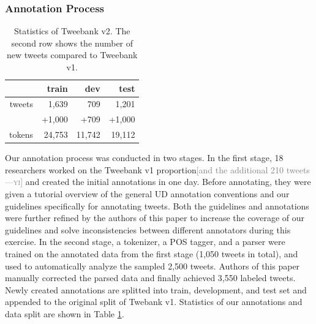 \documentclass[11pt,a4paper]{article}
\newcommand{\yicomment}[1]{\textcolor{gray}{[#1 ---\textsc{yi}]}}
\begin{document}
\subsubsection{Annotation Process}
\begin{table}
	\centering
	\begin{tabular}{rrrr}
		\hline
		& train & dev & test \\
		\hline
		tweets 		&	1,639 		&	709		&	1,201\\
		& +1,000 & +709 & +1,000\\
		tokens 		&	24,753		&	11,742	&	19,112\\
		\hline
	\end{tabular}
\caption{Statistics of {\sc Tweebank v2}.
The second row shows the number of new tweets compared to
{\sc Tweebank v1}.\label{tbl:data-stat}
}
\end{table}
Our annotation process was conducted in two stages.
In the first stage, 18 researchers worked on the {\sc Tweebank v1}
proportion\yicomment{and the additional 210 tweets} and created the initial annotations in one day.
Before annotating, they were given a tutorial overview of the general UD
annotation conventions and our guidelines specifically for annotating tweets.
Both the guidelines and annotations
were further refined by the authors of this paper to increase
the coverage of our guidelines and solve inconsistencies between
different annotators during this exercise. In the second stage, a tokenizer, a POS tagger, and a
parser were trained on the annotated data from the first stage (1,050 tweets in total),
and used to automatically analyze the sampled 2,500 tweets.  Authors 
of this paper manually corrected the parsed data and finally achieved 3,550 labeled tweets.
Newly created annotations are splitted into train, development, and test set and appended
to the original split of {\sc Twebank v1}. Statistics of our annotations and data split are shown
in Table \ref{tbl:data-stat}.
\end{document}
